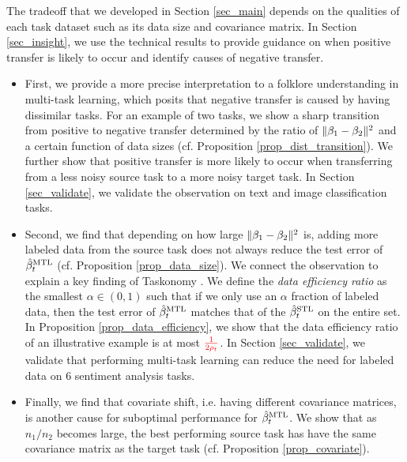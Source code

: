 The tradeoff that we developed in Section \ref{sec_main} depends on the qualities of each task dataset such as its data size and covariance matrix.
In Section \ref{sec_insight}, we use the technical results to provide guidance on when positive transfer is likely to occur and identify causes of negative transfer.
\begin{itemize}
		\item First, we provide a more precise interpretation to a folklore understanding in multi-task learning, which posits that negative transfer is caused by having dissimilar tasks.
		For an example of two tasks, we show a sharp transition from positive to negative transfer determined by the ratio of $\|\beta_1 - \beta_2\|^2$ and a certain function of data sizes (cf. Proposition \ref{prop_dist_transition}).
		We further show that positive transfer is more likely to occur when transferring from a less noisy source task to a more noisy target task.
		In Section \ref{sec_validate}, we validate the observation on text and image classification tasks.
		\item Second, we find that depending on how large $\|\beta_1 - \beta_2\|^2$ is, adding more labeled data from the source task does not always reduce the test error of $\hat{\beta}_t^{\text{MTL}}$ (cf. Proposition \ref{prop_data_size}).
	We connect the observation to explain a key finding of Taskonomy \cite{ZSSGM18}.
	We define the \textit{data efficiency ratio} as the smallest $\alpha\in(0, 1)$ such that if we only use an $\alpha$ fraction of labeled data, then the test error of $\hat{\beta}_t^{\text{MTL}}$ matches that of the $\hat{\beta}_t^{\text{STL}}$ on the entire set.
	In Proposition \ref{prop_data_efficiency}, we show that the data efficiency ratio of an illustrative example is at most $\textcolor{red}{\frac {1}{2\rho_t}}$.
	In Section \ref{sec_validate}, we validate that performing multi-task learning can reduce the need for labeled data on 6 sentiment analysis tasks. %
		\item Finally, we find that covariate shift, i.e. having different covariance matrices, is another cause for suboptimal performance for $\hat{\beta}_t^{\text{MTL}}$.
		We show that as $n_1 / n_2$ becomes large, the best performing source task has have the same covariance matrix as the target task (cf. Proposition \ref{prop_covariate}).
\end{itemize}

